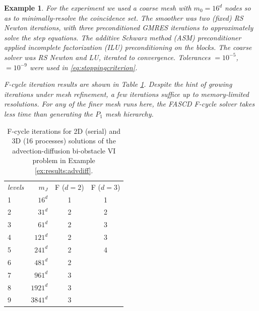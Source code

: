 \documentclass[letterpaper,final,12pt,reqno]{amsart}
\theoremstyle{cstyle}
\theoremstyle{cstyle*}
\theoremstyle{dstyle}
\newtheorem{example}[theorem]{Example}
\numberwithin{equation}{section}
\numberwithin{figure}{section}
\numberwithin{table}{section}
\numberwithin{theorem}{section}
\begin{document}
\begin{example}
For the experiment we used a coarse mesh with $m_0=16^d$ nodes so as to minimally-resolve the coincidence set.  The smoother was two (fixed) RS Newton iterations,  with three preconditioned GMRES iterations to approximately solve the step equations.  The additive Schwarz method (ASM) preconditioner applied incomplete factorization (ILU) preconditioning on the blocks.  The coarse solver was RS Newton and LU, iterated to convergence.  Tolerances  $=10^{-5}$,  $=10^{-9}$ were used in \eqref{eq:stoppingcriterion}.

F-cycle iteration results are shown in Table \ref{tab:results:advdiff}.  Despite the hint of growing iterations under mesh refinement, a few iterations suffice up to memory-limited resolutions.  For any of the finer mesh runs here, the FASCD F-cycle solver takes less time than generating the $P_1$ mesh hierarchy.
\end{example}

\begin{table}[ht]
\begin{tabular}{lr@{\hskip 7mm}c@{\hskip 4mm}c}
\emph{levels} & $m_J$ & F ($d=2$) & F ($d=3$) \\ \cmidrule{1-4}
 1 &    $16^d$ & 1 & 1 \\
 2 &    $31^d$ & 2 & 2 \\
 3 &    $61^d$ & 2 & 3 \\
 4 &   $121^d$ & 2 & 3 \\
 5 &   $241^d$ & 2 & 4 \\
 6 &   $481^d$ & 2 \\
 7 &   $961^d$ & 3 \\
 8 &  $1921^d$ & 3 \\
 9 &  $3841^d$ & 3
\end{tabular}
\bigskip
\caption{F-cycle iterations for 2D (serial) and 3D (16 processes) solutions of the advection-diffusion bi-obstacle VI problem in Example \ref{ex:results:advdiff}.}
\label{tab:results:advdiff}
\end{table}
\end{document}
